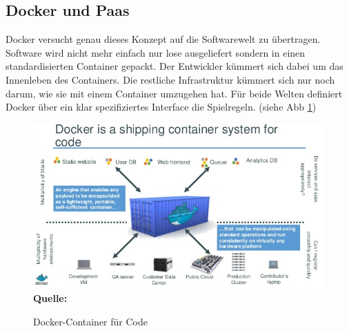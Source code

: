 \subsection{Docker und Paas}
\label{sec:docker_und_paas}
Docker versucht genau dieses Konzept auf die Softwarewelt zu übertragen. 
Software wird nicht mehr einfach nur lose ausgeliefert sondern in einen standardisierten Container gepackt. Der Entwickler kümmert sich dabei um das Innenleben des Containers. Die restliche Infrastruktur kümmert sich nur noch darum, wie sie mit einem Container umzugehen hat. Für beide Welten definiert Docker über ein klar spezifiziertes Interface die Spielregeln. (siehe Abb \ref{fig:container_fuer_code})
\begin{figure}[htbp]
  \centering  
  \includegraphics[scale=0.7]{img/hardware_software_container.jpg}\\
  \footnotesize\sffamily\textbf{Quelle:} \cite{hykes_docker_2013}
  \caption{Docker-Container für Code}
  \label{fig:container_fuer_code}
\end{figure}

